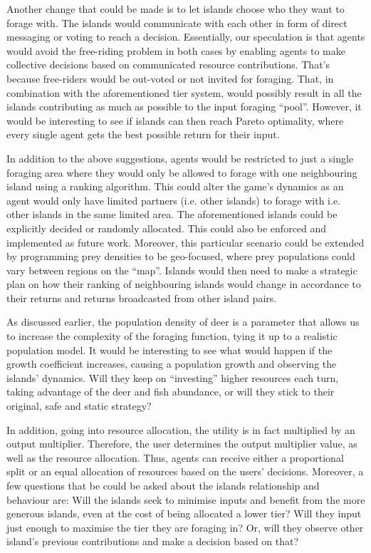 Another change that could be made is to let islands choose who they want to forage with. The islands would communicate with each other in form of direct messaging or voting to reach a decision. Essentially, our speculation is that agents would avoid the free-riding problem in both cases by enabling agents to make collective decisions based on communicated resource contributions. That’s because free-riders would be out-voted or not invited for foraging. That, in combination with the aforementioned tier system, would possibly result in all the islands contributing as much as possible to the input foraging “pool”. However, it would be interesting to see if islands can then reach Pareto optimality, where every single agent gets the best possible return for their input.

In addition to the above suggestions, agents would be restricted to just a single foraging area where they would only be allowed to forage with one neighbouring island using a ranking algorithm. This could alter the game's dynamics as an agent would only have limited partners (i.e. other islands) to forage with i.e. other islands in the same limited area. The aforementioned islands could be explicitly decided or randomly allocated. This could also be enforced and implemented as future work. Moreover, this particular scenario could be extended by programming prey densities to be geo-focused, where prey populations could vary between regions on the “map”. Islands would then need to make a strategic plan on how their ranking of neighbouring islands would change in accordance to their returns and returns broadcasted from other island pairs.

As discussed earlier, the population density of deer is a parameter that allows us to increase the complexity of the foraging function, tying it up to a realistic population model. It would be interesting to see what would happen if the growth coefficient increases, causing a population growth and observing the islands’ dynamics. Will they keep on “investing” higher resources each turn, taking advantage of the deer and fish abundance, or will they stick to their original, safe and static strategy?

In addition, going into resource allocation, the utility is in fact multiplied by an output multiplier. Therefore, the user determines the output multiplier value, as well as the resource allocation. Thus, agents can receive either a proportional split or an equal allocation of resources based on the users' decisions. Moreover, a few questions that be could be asked about the islands relationship and behaviour are: Will the islands seek to minimise inputs and benefit from the more generous islands, even at the cost of being allocated a lower tier? Will they input just enough to maximise the tier they are foraging in? Or, will they observe other island’s previous contributions and make a decision based on that?

